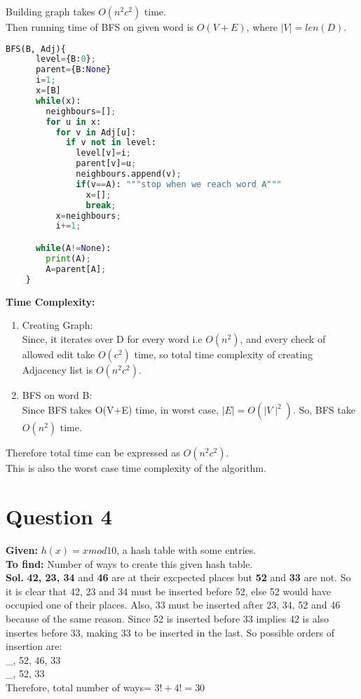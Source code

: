 \documentclass{article}
\begin{document}
  Building graph takes $O(n^2c^2)$ time.\\
  Then running time of BFS on given word is $O(V+E)$, where $\mid V \mid = len(D)$.
  \begin{lstlisting}[language=Python]
    BFS(B, Adj){
      level={B:0};
      parent={B:None}
      i=1;
      x=[B]
      while(x):
        neighbours=[];
        for u in x:
          for v in Adj[u]:
            if v not in level:
              level[v]=i;
              parent[v]=u;
              neighbours.append(v);
              if(v==A): """stop when we reach word A"""
                x=[];
                break;
          x=neighbours;
          i+=1;

      while(A!=None):
        print(A);
        A=parent[A];
    }
  \end{lstlisting}
\textbf{Time Complexity:}
\begin{enumerate}
  \item Creating Graph: \\
    Since, it iterates over D for every word i.e $O(n^2)$, and every check of allowed edit take $O(c^2)$ time,
    so total time complexity of creating Adjacency list is $O(n^2c^2)$.
  \item BFS on word B:\\
    Since BFS takes O(V+E) time, in worst case, $\mid E \mid=O(\mid V \mid^2)$. So, BFS take $O(n^2)$ time.
\end{enumerate}
Therefore total time can be expressed as $O(n^2c^2)$.\\
This is also the worst case time complexity of the algorithm.

\section*{Question 4}
\textbf{Given:} $h(x)= x mod 10$, a hash table with some entries.\\
\textbf{To find:} Number of ways to create this given hash table.\\
\textbf{Sol.} \textbf{42, 23, 34} and \textbf{46} are at their excpected places but \textbf{52} and \textbf{33} are not.
So it is clear that 42, 23 and 34 must be inserted before 52, else 52 would have occupied one of their places.
Also, 33 must be inserted after 23, 34, 52 and 46 because of the same reason. Since 52 is inserted before 33 implies 42 is also
insertes before 33, making 33 to be inserted in the last.
So possible orders of insertion are:\\
_, 52, 46, 33\\
_, 52, 33\\
Therefore, total number of ways= $3! + 4! = 30$
\end{document}
